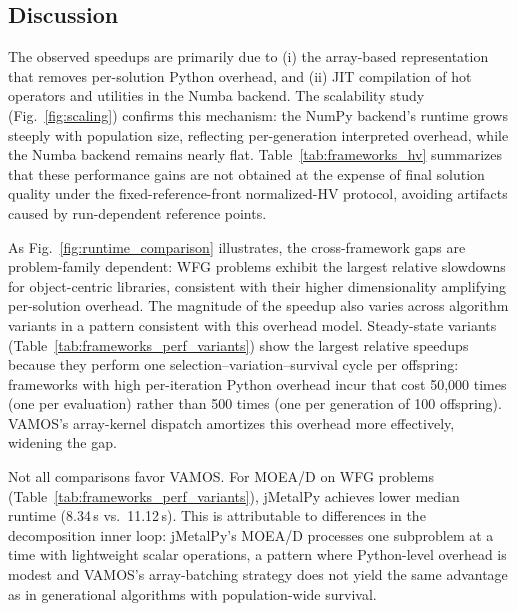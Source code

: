 \documentclass[journal]{IEEEtran}
\newcommand{\VAMOS}{VAMOS}
\begin{document}
\subsection{Discussion}

The observed speedups are primarily due to (i) the array-based representation that removes per-solution Python overhead, and (ii) JIT compilation of hot operators and utilities in the Numba backend. The scalability study (Fig.~\ref{fig:scaling}) confirms this mechanism: the NumPy backend's runtime grows steeply with population size, reflecting per-generation interpreted overhead, while the Numba backend remains nearly flat. Table~\ref{tab:frameworks_hv} summarizes that these performance gains are not obtained at the expense of final solution quality under the fixed-reference-front normalized-HV protocol, avoiding artifacts caused by run-dependent reference points.

As Fig.~\ref{fig:runtime_comparison} illustrates, the cross-framework gaps are problem-family dependent: WFG problems exhibit the largest relative slowdowns for object-centric libraries, consistent with their higher dimensionality amplifying per-solution overhead. The magnitude of the speedup also varies across algorithm variants in a pattern consistent with this overhead model. Steady-state variants (Table~\ref{tab:frameworks_perf_variants}) show the largest relative speedups because they perform one selection--variation--survival cycle per offspring: frameworks with high per-iteration Python overhead incur that cost 50{,}000 times (one per evaluation) rather than 500 times (one per generation of 100 offspring). \VAMOS{}'s array-kernel dispatch amortizes this overhead more effectively, widening the gap.

Not all comparisons favor \VAMOS{}. For MOEA/D on WFG problems (Table~\ref{tab:frameworks_perf_variants}), jMetalPy achieves lower median runtime (8.34\,s vs.\ 11.12\,s). This is attributable to differences in the decomposition inner loop: jMetalPy's MOEA/D processes one subproblem at a time with lightweight scalar operations, a pattern where Python-level overhead is modest and \VAMOS{}'s array-batching strategy does not yield the same advantage as in generational algorithms with population-wide survival.
\end{document}
